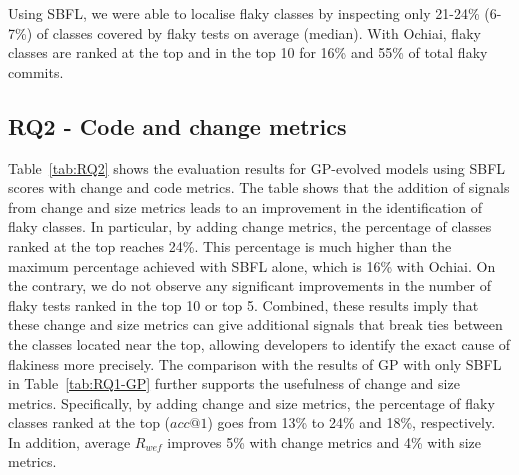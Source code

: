 \begin{tcolorbox}
Using SBFL, we were able to localise flaky classes by inspecting only 21-24\% (6-7\%) of classes covered by flaky tests on average (median). With Ochiai, flaky classes are ranked at the top and in the top 10 for 16\% and 55\% of total flaky commits. 
\end{tcolorbox}

\subsection{RQ2 - Code and change metrics}

Table~\ref{tab:RQ2} shows the evaluation results for GP-evolved models using SBFL scores with change and code metrics.
The table shows that the addition of signals from change and size metrics leads to an improvement in the identification of flaky classes.
In particular, by adding change metrics, the percentage of classes ranked at the top reaches 24\%. 
This percentage is much higher than the maximum percentage achieved with SBFL alone, which is 16\% with Ochiai.
On the contrary, we do not observe any significant improvements in the number of flaky tests ranked in the top 10 or top 5. 
Combined, these results imply that these change and size metrics can give additional signals that break ties between the classes located near the top, allowing developers to identify the exact cause of flakiness more precisely.
The comparison with the results of GP with only SBFL \formulas in Table~\ref{tab:RQ1-GP} further supports the usefulness of change and size metrics.
Specifically, by adding change and size metrics, the percentage of flaky classes ranked at the top ($acc@1$) goes from 13\% to 24\% and 18\%, respectively. In addition, average $R_{wef}$ improves 5\% with change metrics and 4\% with size metrics. 

